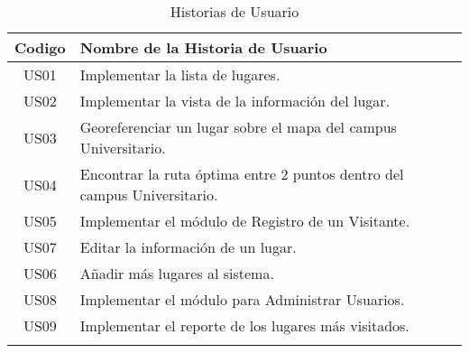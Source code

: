 \begin{table}[H]

  \begin{center}
    \begin{tabularx}{0.75\textwidth}{ c X }

      \toprule
        \textbf{Codigo} &
        \textbf{Nombre de la Historia de Usuario} \\

      \midrule
      \addlinespace
      US01 & Implementar la lista de lugares.\\

      \addlinespace
      US02 & Implementar la vista de la información del lugar.\\

      \addlinespace
      US03 & Georeferenciar un lugar sobre el mapa del campus Universitario.\\
      \addlinespace
      US04 & Encontrar la ruta óptima entre 2 puntos dentro del campus Universitario.\\
      \addlinespace
      US05 & Implementar el módulo de Registro de un Visitante.\\
      \addlinespace
      US07 & Editar la información de un lugar.\\
      \addlinespace
      US06 & Añadir más lugares al sistema.\\
      \addlinespace
      US08 & Implementar el módulo para Administrar Usuarios.\\
      \addlinespace
      US09 & Implementar el reporte de los lugares más visitados.\\
      \addlinespace

      \bottomrule
    \end{tabularx}

    \caption{Historias de Usuario}
    \label{tab:us_table}
%
  \end{center}
\end{table}
